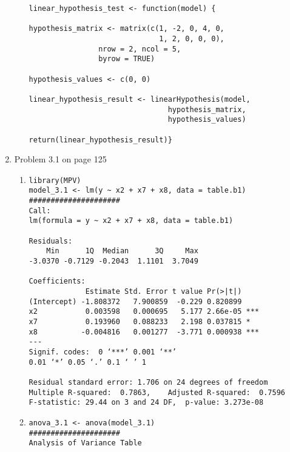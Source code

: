 \documentclass[12pt]{article}
\begin{document}
\begin{enumerate}[1.]
\begin{enumerate}[a.]
\begin{verbatim}
linear_hypothesis_test <- function(model) {

hypothesis_matrix <- matrix(c(1, -2, 0, 4, 0, 
                              1, 2, 0, 0, 0),
                nrow = 2, ncol = 5, 
                byrow = TRUE)

hypothesis_values <- c(0, 0)

linear_hypothesis_result <- linearHypothesis(model, 
                                hypothesis_matrix, 
                                hypothesis_values)

return(linear_hypothesis_result)}
                    \end{verbatim}
                \end{enumerate}

                \item Problem 3.1 on page 125
                \begin{enumerate}
                    \item 
                    \begin{verbatim}
library(MPV)
model_3.1 <- lm(y ~ x2 + x7 + x8, data = table.b1)
#####################
Call:
lm(formula = y ~ x2 + x7 + x8, data = table.b1)

Residuals:
    Min      1Q  Median      3Q     Max 
-3.0370 -0.7129 -0.2043  1.1101  3.7049 

Coefficients:
             Estimate Std. Error t value Pr(>|t|)    
(Intercept) -1.808372   7.900859  -0.229 0.820899    
x2           0.003598   0.000695   5.177 2.66e-05 ***
x7           0.193960   0.088233   2.198 0.037815 *  
x8          -0.004816   0.001277  -3.771 0.000938 ***
---
Signif. codes:  0 ‘***’ 0.001 ‘**’
0.01 ‘*’ 0.05 ‘.’ 0.1 ‘ ’ 1

Residual standard error: 1.706 on 24 degrees of freedom
Multiple R-squared:  0.7863,	Adjusted R-squared:  0.7596 
F-statistic: 29.44 on 3 and 24 DF,  p-value: 3.273e-08
                    \end{verbatim}
                    \item 
                    \begin{verbatim}
anova_3.1 <- anova(model_3.1)
#####################
Analysis of Variance Table


\end{verbatim}
\end{enumerate}
\end{enumerate}
\end{document}
